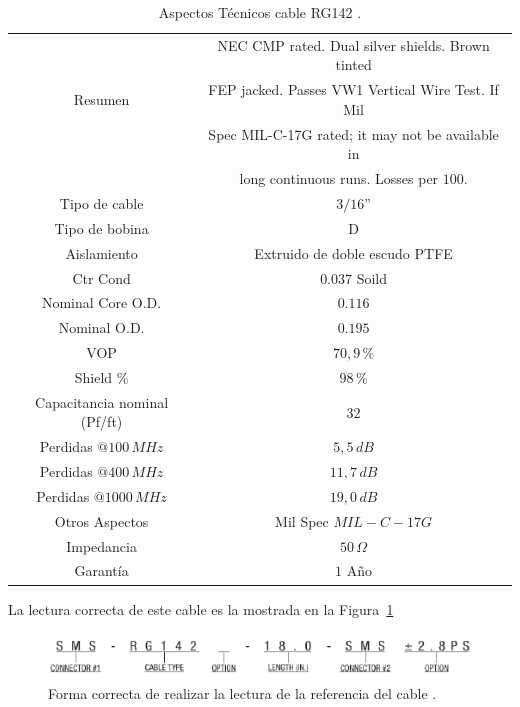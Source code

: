 \documentclass[12pt,graphicx,caption,rotating]{article}
\begin{document}
\begin{table}[H]
  \centering
  \caption{Aspectos Técnicos cable RG142 \cite{page1}.}
  \begin{tabular}{|c|c|} \hline
    \multicolumn{ 1}{|c|}{} & NEC CMP rated. Dual silver shields. Brown tinted \\ 
    \multicolumn{ 1}{|c|}{Resumen} & FEP jacked. Passes VW1 Vertical Wire Test. If Mil \\ 
    \multicolumn{ 1}{|c|}{} & Spec MIL-C-17G rated; it may not be available in \\ 
    \multicolumn{ 1}{|c|}{} & long continuous runs. Losses per $100$. \\ \hline
    Tipo de cable & $3/16”$ \\ \hline
    Tipo de bobina & D \\ \hline
    Aislamiento & Extruido de doble escudo PTFE \\ \hline
    Ctr Cond & $0.037$ Soild \\ \hline
    Nominal Core O.D. & $0.116$ \\ \hline
    Nominal O.D. & $0.195$ \\ \hline
    VOP & $70,9\,\%$ \\ \hline
    Shield \% & $98\,\%$ \\ \hline
    Capacitancia nominal (Pf/ft) & $32$ \\ \hline
    Perdidas $@ 100\,MHz$ & $5,5\, dB$ \\ \hline
    Perdidas $@ 400\,MHz$ & $11,7\, dB$ \\ \hline
    Perdidas $@ 1000\,MHz$ & $19,0\, dB$ \\ \hline
    Otros Aspectos & Mil Spec $MIL-C-17G$ \\ \hline
    Impedancia & $50\, \Omega$ \\ \hline
    Garantía & $1$ Año \\ \hline
  \end{tabular}
  \label{tab1}
\end{table}
\noindent
La lectura correcta de este cable es la mostrada en la Figura~\ref{fig1}
\begin{figure}[H]
	\centering
		\includegraphics[scale=0.5]{fig1.png}
	\caption{Forma correcta de realizar la lectura de la referencia del cable \cite{page3}.}
	\label{fig1}
\end{figure}
\end{document}
